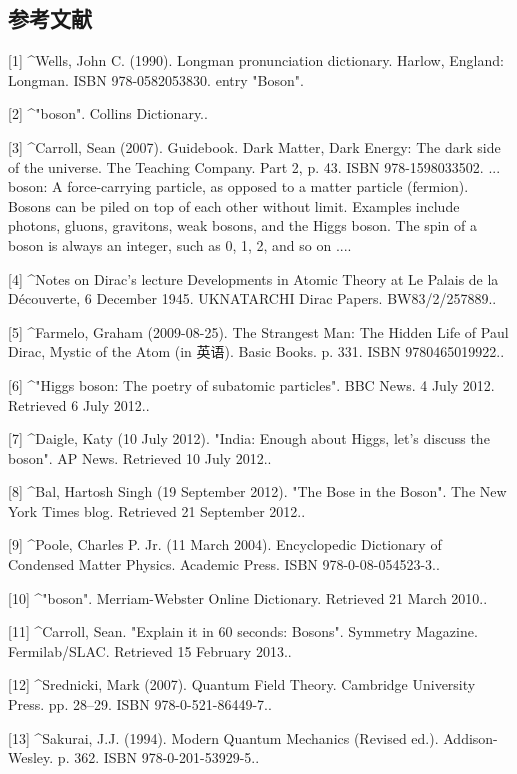 \subsection{参考文献}
[1]
^Wells, John C. (1990). Longman pronunciation dictionary. Harlow, England: Longman. ISBN 978-0582053830. entry "Boson".

[2]
^"boson". Collins Dictionary..

[3]
^Carroll, Sean (2007). Guidebook. Dark Matter, Dark Energy: The dark side of the universe. The Teaching Company. Part 2, p. 43. ISBN 978-1598033502. ... boson: A force-carrying particle, as opposed to a matter particle (fermion). Bosons can be piled on top of each other without limit. Examples include photons, gluons, gravitons, weak bosons, and the Higgs boson. The spin of a boson is always an integer, such as 0, 1, 2, and so on ....

[4]
^Notes on Dirac's lecture Developments in Atomic Theory at Le Palais de la Découverte, 6 December 1945. UKNATARCHI Dirac Papers. BW83/2/257889..

[5]
^Farmelo, Graham (2009-08-25). The Strangest Man: The Hidden Life of Paul Dirac, Mystic of the Atom (in 英语). Basic Books. p. 331. ISBN 9780465019922..

[6]
^"Higgs boson: The poetry of subatomic particles". BBC News. 4 July 2012. Retrieved 6 July 2012..

[7]
^Daigle, Katy (10 July 2012). "India: Enough about Higgs, let's discuss the boson". AP News. Retrieved 10 July 2012..

[8]
^Bal, Hartosh Singh (19 September 2012). "The Bose in the Boson". The New York Times blog. Retrieved 21 September 2012..

[9]
^Poole, Charles P. Jr. (11 March 2004). Encyclopedic Dictionary of Condensed Matter Physics. Academic Press. ISBN 978-0-08-054523-3..

[10]
^"boson". Merriam-Webster Online Dictionary. Retrieved 21 March 2010..

[11]
^Carroll, Sean. "Explain it in 60 seconds: Bosons". Symmetry Magazine. Fermilab/SLAC. Retrieved 15 February 2013..

[12]
^Srednicki, Mark (2007). Quantum Field Theory. Cambridge University Press. pp. 28–29. ISBN 978-0-521-86449-7..

[13]
^Sakurai, J.J. (1994). Modern Quantum Mechanics (Revised ed.). Addison-Wesley. p. 362. ISBN 978-0-201-53929-5..



